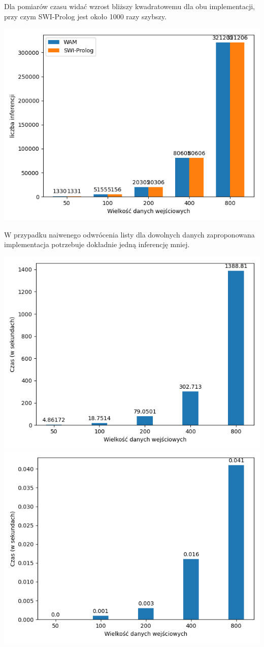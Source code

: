 Dla pomiarów czasu widać wzrost bliższy kwadratowemu dla obu implementacji, przy czym SWI-Prolog jest około 1000 razy szybszy.

\includegraphics{nrevi.png}

W przypadku naiwenego odwrócenia listy dla dowolnych danych zaproponowana implementacja potrzebuje dokładnie jedną inferencję mniej.

\includegraphics{nrevtw.png}
\includegraphics{nrevts.png}


